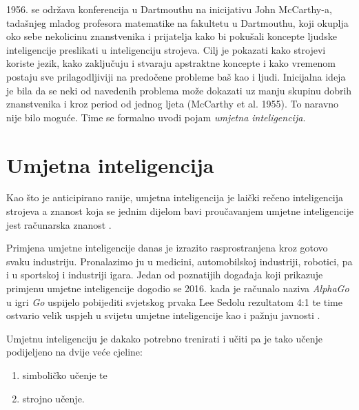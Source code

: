 \documentclass[times, utf8, zavrsni]{fer}
\begin{document}
1956. se održava konferencija u Dartmouthu \citep{wiki:DART} na inicijativu John McCarthy-a, tadašnjeg mladog profesora matematike na fakultetu u Dartmouthu, koji okuplja oko sebe nekolicinu znanstvenika i prijatelja kako bi pokušali koncepte ljudske inteligencije preslikati u inteligenciju strojeva. Cilj je pokazati kako strojevi koriste jezik, kako zaključuju i stvaraju apstraktne koncepte i kako vremenom postaju sve prilagodljiviji na predočene probleme baš kao i ljudi. Inicijalna ideja je bila da se neki od navedenih problema može dokazati uz manju skupinu dobrih znanstvenika i kroz period od jednog ljeta (McCarthy et al. 1955). To naravno nije bilo moguće. Time se formalno uvodi pojam \textit{umjetna inteligencija}.

\section{Umjetna inteligencija}
Kao što je anticipirano ranije, umjetna inteligencija  je laički rečeno inteligencija strojeva a znanost koja se jednim dijelom bavi proučavanjem umjetne inteligencije jest računarska znanost .

Primjena umjetne inteligencije danas je izrazito rasprostranjena kroz gotovo svaku industriju. Pronalazimo ju u medicini, automobilskoj industriji, robotici, pa i u sportskoj i industriji igara. Jedan od poznatijih događaja koji prikazuje primjenu umjetne inteligencije dogodio se 2016. kada je računalo naziva \textit{AlphaGo} u igri \textit{Go} uspijelo pobijediti svjetskog prvaka Lee Sedolu rezultatom 4:1 te time ostvario velik uspjeh u svijetu umjetne inteligencije kao i pažnju javnosti \citep{moyerGO}.

Umjetnu inteligenciju je dakako potrebno trenirati i učiti pa je tako učenje podijeljeno na dvije veće cjeline:
\begin{center}
    \begin{enumerate}
        \item simboličko učenje te
        \item strojno učenje.
    \end{enumerate}
\end{center}
\end{document}
